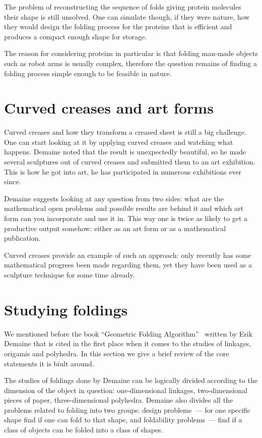 \documentclass[a4paper,12pt]{article}
\begin{document}
The problem of reconstructing the sequence of folds giving protein molecules their shape is still unsolved. One can simulate though, if they were nature, how they would design the folding process for the proteins that is efficient and produces a compact enough shape for storage.

The reason for considering proteins in particular is that folding man-made objects such as robot arms is usually complex, therefore the question remains of finding a folding process simple enough to be feasible in nature.

\section{Curved creases and art forms}

Curved creases and how they transform a creased sheet is still a big challenge. One can start looking at it by applying curved creases and watching what happens. Demaine noted that the result is unexpectedly beautiful, so he made several sculptures out of curved creases and submitted them to an art exhibition. This is how he got into art, he has participated in numerous exhibitions ever since.

Demaine suggests looking at any question from two sides: what are the mathematical open problems and possible results are behind it and which art form can you incorporate and use it in. This way one is twice as likely to get a productive output somehow: either as an art form or as a mathematical publication.

Curved creases provide an example of such an approach: only recently has some mathematical progrees been made regarding them, yet they have been used as a sculpture technique for some time already.

\section{Studying foldings}

We mentioned before the book “Geometric Folding Algorithm”~\cite{DO07} written by Erik Demaine that is cited in the first place when it comes to the studies of linkages, origamis and polyhedra. In this section we give a brief review of the core statements it is biult around.

The studies of foldings done by Demaine can be logically divided according to the dimension of the object in question: one-dimensional linkages, two-dimensional pieces of paper, three-dimensional polyhedra. Demaine also divides all the problems related to folding into two groups: design problems~— for one specific shape find if one can fold to that shape, and foldability problems~— find if a class of objects can be folded into a class of shapes.
\end{document}
